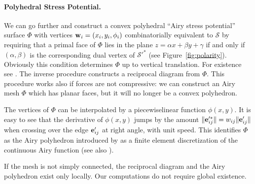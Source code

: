 \documentclass[review]{acmsiggraph}
\def\SS{{\mathcal S}}
\begin{document}
\paragraph{Polyhedral Stress Potential.}

We can go further and construct a convex polyhedral ``Airy stress
potential'' surface $\Phi$ with vertices ${\mathbf w}_i=(x_i,y_i,\phi_i)$
combinatorially equivalent to $\SS$ by requiring that a primal face of
$\Phi$ lies in the plane $z=\alpha x + \beta y + \gamma$ if and only if
$(\alpha,\beta)$ is the corresponding dual vertex of $\SS'^*$ (see
Figure~\ref{fig:polarity}). Obviously this condition determines $\Phi$ up
to vertical translation. For existence see \cite{Ash1988}. The inverse
procedure constructs a reciprocal diagram from $\Phi$. This procedure
works also if forces are not compressive: we can construct an Airy mesh
$\Phi$ which has planar faces, but it will no longer be a convex
polyhedron.

The vertices of $\Phi$ can be interpolated by a piecewise\dash linear
function $\phi(x,y)$. It is easy to see that the derivative of $\phi(x,y)$
jumps by the amount $\|{\mathbf e}_{ij}'^*\| = w_{ij}\|{\mathbf e}_{ij}'\|$ when crossing
over the edge ${\mathbf e}'_{ij}$ at right angle, with unit speed. This identifies
$\Phi$ as the Airy polyhedron introduced by \cite{Fraternali2002a} as a
finite element discretization of the continuous Airy function (see also
\cite{Fraternali2010}).

If the mesh is not simply connected, the reciprocal diagram and the Airy
polyhedron exist only locally. Our computations do not require global existence.
\end{document}

